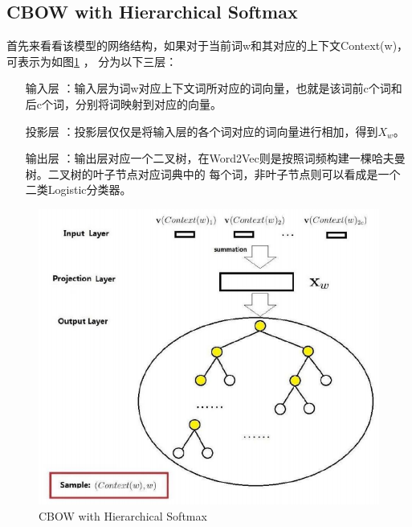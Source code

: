 \documentclass[UTF8]{ctexart}
\begin{document}
\subsection{CBOW with Hierarchical Softmax}
首先来看看该模型的网络结构，如果对于当前词w和其对应的上下文Context(w)，可表示为如图\ref{Fig:cbow-hs} ，
分为以下三层：
\begin{itemize}
\item[输入层]：输入层为词w对应上下文词所对应的词向量，也就是该词前c个词和后c个词，分别将词映射到对应的向量。
\item[投影层]：投影层仅仅是将输入层的各个词对应的词向量进行相加，得到$X_w$。
\item[输出层]：输出层对应一个二叉树，在Word2Vec则是按照词频构建一棵哈夫曼树。二叉树的叶子节点对应词典中的
每个词，非叶子节点则可以看成是一个二类Logistic分类器。
\end{itemize}
\begin{figure}[h!]
    \centering     
    \includegraphics[width=1.0\textwidth]{cbow-hs}   
    \caption{\label{Fig:cbow-hs}CBOW with Hierarchical Softmax} 
\end{figure}
\end{document}
